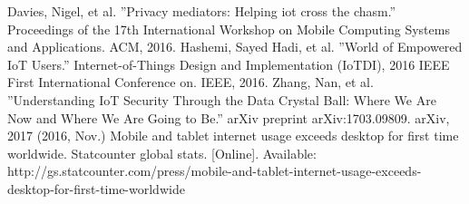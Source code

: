  Davies, Nigel, et al. ''Privacy mediators: Helping iot cross the chasm.'' Proceedings of the 17th International Workshop on Mobile Computing Systems and Applications. ACM, 2016.
 Hashemi, Sayed Hadi, et al. ''World of Empowered IoT Users.'' Internet-of-Things Design and Implementation (IoTDI), 2016 IEEE First International Conference on. IEEE, 2016.
 Zhang, Nan, et al. ''Understanding IoT Security Through the Data Crystal Ball: Where We Are Now and Where We Are Going to Be.'' arXiv preprint arXiv:1703.09809. arXiv, 2017
 (2016, Nov.) Mobile and tablet internet usage exceeds desktop for first time worldwide. Statcounter global stats. [Online]. Available: http://gs.statcounter.com/press/mobile-and-tablet-internet-usage-exceeds-desktop-for-first-time-worldwide